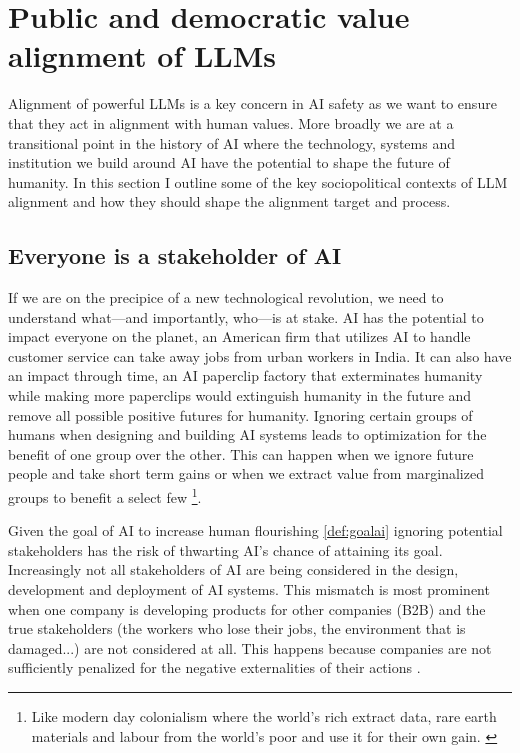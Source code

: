 \section{Public and democratic value alignment of LLMs}
\label{sec:public_democratic_ai}

Alignment of powerful LLMs is a key concern in AI safety as we want to ensure that they act in alignment with human values. More broadly we are at a transitional point in the history of AI where the technology, systems and institution we build around AI have the potential to shape the future of humanity. In this section I outline some of the key sociopolitical contexts of LLM alignment and how they should shape the alignment target and process.

\subsection{Everyone is a stakeholder of AI}

If we are on the precipice of a new technological revolution, we need to understand what—and importantly, who—is at stake. AI has the potential to impact everyone on the planet, an American firm that utilizes AI to handle customer service can take away jobs from urban workers in India. It can also have an impact through time, an AI paperclip factory that exterminates humanity while making more paperclips would extinguish humanity in the future and remove all possible positive futures for humanity. Ignoring certain groups of humans when designing and building AI systems leads to optimization for the benefit of one group over the other. This can happen when we ignore future people and take short term gains or when we extract value from marginalized groups to benefit a select few \footnote{Like modern day colonialism where the world's rich extract data, rare earth materials and labour from the world's poor and use it for their own gain. \cite{crawfordAtlasAIPower2021}}. 

Given the goal of AI to increase human flourishing \ref{def:goalai} ignoring potential stakeholders has the risk of thwarting AI's chance of attaining its goal. Increasingly not all stakeholders of AI are being considered in the design, development and deployment of AI systems. This mismatch is most prominent when one company is developing products for other companies (B2B) and the true stakeholders (the workers who lose their jobs, the environment that is damaged...) are not considered at all. This happens because companies are not sufficiently penalized for the negative externalities of their actions \cite{hardinFiltersFollyHow1985,r.h.coarseProblemSocialCost}.

